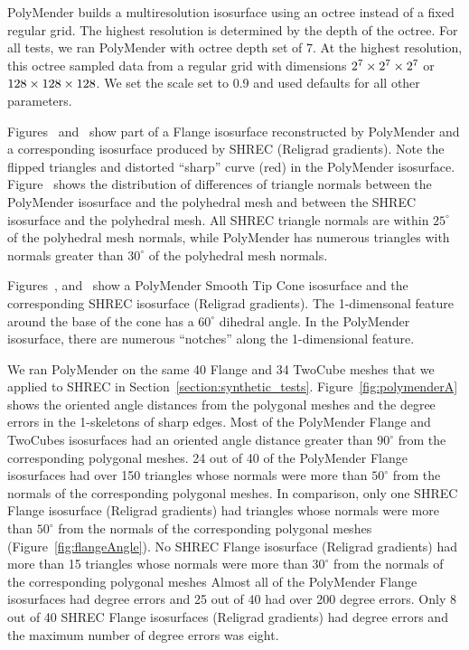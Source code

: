 PolyMender builds a multiresolution isosurface
using an octree instead of a fixed regular grid.
The highest resolution is determined by the depth of the octree.
For all tests, we ran PolyMender with octree depth set of 7.
At the highest resolution,
this octree sampled data from a regular grid with dimensions $2^7 \times 2^7 \times 2^7$ or $128 \times 128 \times 128$.
We set the scale set to 0.9 and used defaults for all other parameters.

Figures~\protect{} and~\protect{} 
show part of a Flange isosurface reconstructed by PolyMender
and a corresponding isosurface produced by SHREC (Religrad gradients).
Note the flipped triangles and distorted ``sharp'' curve (red) in the PolyMender isosurface.
Figure~\protect{} shows the distribution of differences 
of triangle normals between the PolyMender isosurface and the polyhedral mesh
and between the SHREC isosurface and the polyhedral mesh.
All SHREC triangle normals are within $25^\circ$ of the polyhedral mesh normals,
while PolyMender has numerous triangles with normals greater than $30^\circ$
of the polyhedral mesh normals.

Figures~, 
and~
show a PolyMender Smooth Tip Cone isosurface and 
the corresponding SHREC isosurface (Religrad gradients).
The 1-dimensonal feature around the base of the cone has a $60^\circ$ dihedral angle.
In the PolyMender isosurface,
there are numerous ``notches'' along the 1-dimensional feature.

We ran PolyMender on the same 40 Flange and 34 TwoCube meshes
that we applied to SHREC in Section~\ref{section:synthetic_tests}.
Figure~\ref{fig:polymenderA} shows the oriented angle distances from the polygonal meshes
and the degree errors in the 1-skeletons of sharp edges.
Most of the PolyMender Flange and TwoCubes isosurfaces had an oriented angle distance greater than $90^\circ$
from the corresponding polygonal meshes.
24 out of 40 of the PolyMender Flange isosurfaces had over 150 triangles
whose normals were more than $50^\circ$ from the normals of the corresponding polygonal meshes.
In comparison, only one SHREC Flange isosurface (Religrad gradients) had triangles
whose normals were more than $50^\circ$ from the normals of the corresponding polygonal meshes
(Figure~\ref{fig:flangeAngle}).
No SHREC Flange isosurface (Religrad gradients) had more than 15 triangles
whose normals were more than $30^\circ$ from the normals of the corresponding polygonal meshes
Almost all of the PolyMender Flange isosurfaces had degree errors
and 25 out of 40 had over 200 degree errors.
Only 8 out of 40 SHREC Flange isosurfaces (Religrad gradients) had degree errors
and the maximum number of degree errors was eight.

